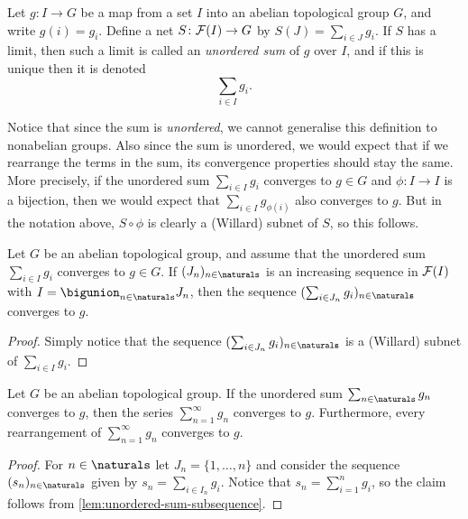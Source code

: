 \documentclass[article, a4paper, 11pt, oneside]{memoir}
\numberwithin{equation}{chapter}
\begin{document}
\begin{definition}
    Let $g \colon I \to G$ be a map from a set $I$ into an abelian topological group $G$, and write $g(i) = g_i$. Define a net $S \colon \mathcal{F}(I) \to G$ by $S(J) = \sum_{i \in J} g_i$. If $S$ has a limit, then such a limit is called an \emph{unordered sum} of $g$ over $I$, and if this is unique then it is denoted
    \begin{equation*}
        \sum_{i \in I} g_i.
    \end{equation*}
\end{definition}
%
Notice that since the sum is \emph{unordered}, we cannot generalise this definition to nonabelian groups. Also since the sum is unordered, we would expect that if we rearrange the terms in the sum, its convergence properties should stay the same. More precisely, if the unordered sum $\sum_{i \in I} g_i$ converges to $g \in G$ and $\phi \colon I \to I$ is a bijection, then we would expect that $\sum_{i \in I} g_{\phi(i)}$ also converges to $g$. But in the notation above, $S \circ \phi$ is clearly a (Willard) subnet of $S$, so this follows.

\begin{lemma}
    \label{lem:unordered-sum-subsequence}
    Let $G$ be an abelian topological group, and assume that the unordered sum $\sum_{i \in I} g_i$ converges to $g \in G$. If $(J_n)_{n\in\naturals}$ is an increasing sequence in $\mathcal{F}(I)$ with $I = \bigunion_{n\in\naturals} J_n$, then the sequence $(\sum_{i \in J_n} g_i)_{n\in\naturals}$ converges to $g$.
\end{lemma}

\begin{proof}
    Simply notice that the sequence $(\sum_{i \in J_n} g_i)_{n\in\naturals}$ is a (Willard) subnet of $\sum_{i \in I} g_i$.
\end{proof}


\begin{proposition}
    Let $G$ be an abelian topological group. If the unordered sum $\sum_{n \in \naturals} g_n$ converges to $g$, then the series $\sum_{n=1}^\infty g_n$ converges to $g$. Furthermore, every rearrangement of $\sum_{n=1}^\infty g_n$ converges to $g$.
\end{proposition}

\begin{proof}
    For $n \in \naturals$ let $J_n = \{1, \ldots, n\}$ and consider the sequence $(s_n)_{n\in\naturals}$ given by $s_n = \sum_{i \in I_n} g_i$. Notice that $s_n = \sum_{i=1}^n g_i$, so the claim follows from \cref{lem:unordered-sum-subsequence}.
\end{proof}
\end{document}
